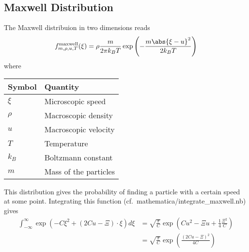 
\subsection{Maxwell Distribution}
\label{sub:Maxwell Distribution}
The Maxwell distribuion in two dimensions reads
\begin{equation}
  \label{eq:maxwell distribution raw}
  f_{m, \rho, u, T}^{\text{maxwell}}(\xi) = \rho \frac{m}{2\pi k_B T} \exp \left( - \frac{m\abs{\xi-u}^2}{2 k_B T}\right)
\end{equation}
where
\begin{center}
  \begin{tabular}{@{}ll@{}}
    \toprule
    Symbol & Quantity  \\
    \midrule
    $\xi$  & Microscopic speed  \\
    $\rho$ & Macroscopic density     \\
    $u$    & Macroscopic velocity   \\
    $T$    & Temperature   \\
    $k_B$  & Boltzmann constant \\
    $m$    & Mass of the particles   \\
    \bottomrule
  \end{tabular}
\end{center}
This distribution gives the probability of finding a particle with a certain speed at some point.
Integrating this function (cf.\ mathematica/integrate\_maxwell.nb) gives
\begin{equation}
  \label{eq:integrate exponential sage}
  \begin{aligned}
    \int_{-\infty}^{\infty} \exp \left(-C \xi^2 + (2Cu - \Xi)\cdot\xi \right) d\xi
    & = \sqrt{\frac{\pi}{C}}\exp \left(Cu^2 - \Xi u + \frac{1}{4} \frac{\Xi^2}{C}\right) \\
    & = \sqrt{\frac{\pi}{C}}\exp \left( \frac{{(2Cu-\Xi)}^2}{4C}\right)
  \end{aligned}
\end{equation}

